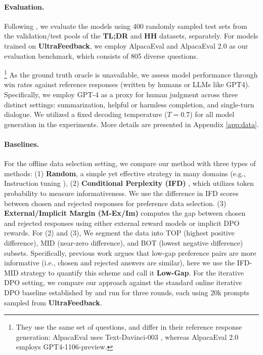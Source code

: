 \paragraph{Evaluation.} Following \citet{rafailov2024direct}, we evaluate the models using 400 randomly sampled test sets from the validation/test pools of the \textbf{TL;DR} and \textbf{HH} datasets, separately. For models trained on \textbf{UltraFeedback}, we employ AlpacaEval and AlpacaEval 2.0 \citep{li2023alpacaeval} as our evaluation benchmark, which consists of 805 diverse questions. {\footnote{They use the same set of questions, and differ in their reference response generation: AlpacaEval uses Text-Davinci-003 \citep{ye2023comprehensive}, whereas AlpacaEval 2.0 employs GPT4-1106-preview.} As the ground truth oracle is unavailable, we assess model performance through win rates against reference responses (written by humans or LLMs like GPT4). 
Specifically, we employ GPT-4 as a proxy for human judgment across three distinct settings: summarization, helpful or harmless completion, and single-turn dialogue. 
We utilized a fixed decoding temperature ($T=0.7$) for all model generation in the experiments. More details are presented in Appendix \ref{app:data}. 

\paragraph{Baselines.} For the offline data selection setting, we compare our method with three types of methods: (1) \textbf{Random}, a simple yet effective strategy in many domains (e.g., Instruction tuning \citep{xia2024less}), (2) \textbf{Conditional Perplexity (IFD)} \citep{li2023quantity}, which utilizes token probability to measure informativeness. We use the difference in IFD scores between chosen and rejected responses for preference data selection. (3) \textbf{External/Implicit Margin (M-Ex/Im)} computes the gap between chosen and rejected responses using either external reward models or implicit DPO rewards. For (2) and (3), We segment the data into TOP (highest positive difference), MID (near-zero difference), and BOT (lowest negative difference) subsets. 
Specifically, previous work \citep{wu2024beta} argues that low-gap preference pairs are more informative (i.e., chosen and rejected answers are similar), here we use the IFD-MID strategy to quantify this scheme and call it \textbf{Low-Gap}. For the iterative DPO setting, we compare our approach against the standard online iterative DPO baseline established by \citet{xiong2024iterative,dong2024rlhf} and run for three rounds, each using 20k prompts sampled from \textbf{UltraFeedback}.

}
